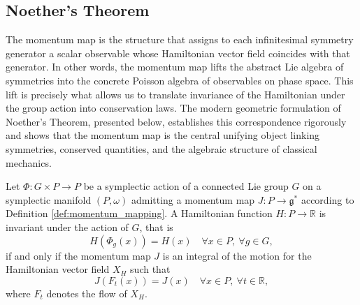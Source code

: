 \subsection*{Noether's Theorem}
The momentum map is the structure that assigns to each infinitesimal symmetry generator a scalar observable whose Hamiltonian vector field coincides with that generator. In other words, the momentum map lifts the abstract Lie algebra of symmetries into the concrete Poisson algebra of observables on phase space. This lift is precisely what allows us to translate invariance of the Hamiltonian under the group action into conservation laws. The modern geometric formulation of Noether's Theorem, presented below, establishes this correspondence rigorously and shows that the momentum map is the central unifying object linking symmetries, conserved quantities, and the algebraic structure of classical mechanics.

\begin{theorem}\label{thm:geometric_noether_iff}
	Let $\Phi: G \times P \to P$ be a symplectic action of a connected Lie group $G$ on a symplectic manifold $(P, \omega)$ admitting a momentum map $J: P \to \mathfrak{g}^*$ according to Definition \ref{def:momentum_mapping}.  A Hamiltonian function $H: P \to \mathbb{R}$ is invariant under the action of $G$, that is
	\[
	H(\Phi_g(x)) = H(x) \quad \forall x \in P, \ \forall g \in G,
	\]
	if and only if the momentum map $J$ is an integral of the motion for the Hamiltonian vector field $X_H$ such that
	\[
	J(F_t(x)) = J(x) \quad \forall x \in P, \ \forall t \in \mathbb{R},
	\]
	where $F_t$ denotes the flow of $X_H$.
\end{theorem}

